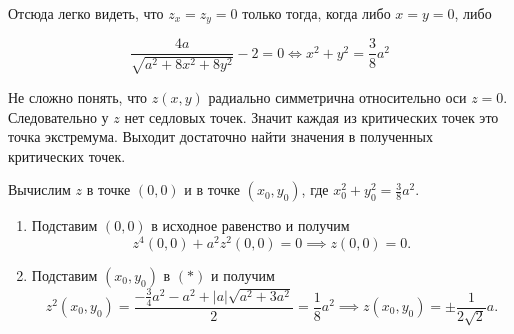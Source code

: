 \documentclass{exam}
\begin{document}
Отсюда легко видеть, что $z_{x} = z_{y} = 0$ только тогда, когда либо $x = y = 0$, либо

$$\frac{4a}{\sqrt{a^2 + 8x^2 + 8y^2}}  - 2 = 0 \iff x^2 + y^2 = \frac{3 }{8}a^2$$

Не сложно понять, что $z(x, y)$ радиально симметрична относительно оси $z = 0$. Следовательно у $z$ нет седловых точек. Значит каждая из критических точек это точка экстремума. Выходит достаточно найти значения в полученных критических точек.

Вычислим $z$ в точке $(0,0)$ и в точке $(x_0, y_0)$, где $x_0^2 + y_0^2 = \frac{3}{8}a^2$.

\begin{enumerate}
    \item Подставим $(0, 0)$ в исходное равенство и получим
    $$z^4(0, 0) + a^2 z^2(0, 0) = 0 \implies z(0, 0) = 0.$$
    \item Подставим $(x_0, y_0)$ в $(*)$ и получим
    $$z^2(x_0, y_0) = \frac{-\frac{3}{4}a^2 - a^2 + |a|\sqrt{a^2 + 3a^2}}{2} = \frac{1}{8}a^2 \implies z(x_0, y_0) = \pm\frac{1}{2\sqrt{2}}a.$$
\end{enumerate}
\end{document}
